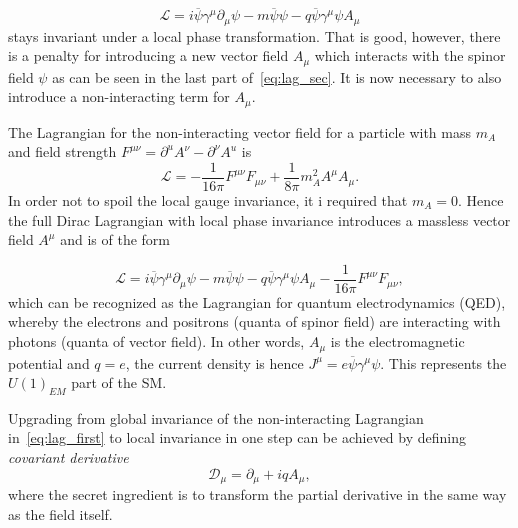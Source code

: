 \begin{equation}
	\mathcal{L} = i\overline{\psi}\gamma^{\mu}\partial_{\mu}\psi - m\overline{\psi}\psi - q\overline{\psi}\gamma^{\mu}\psi A_{\mu}
\label{eq:lag_sec}
\end{equation}
stays invariant under a local phase transformation. That is good, however, there is a penalty for introducing a new vector field $A_{\mu}$ which interacts with the spinor field $\psi$ as can be seen in the last part of~\autoref{eq:lag_sec}. It is now necessary to also introduce a non-interacting term for $A_{\mu}$.

The Lagrangian for the non-interacting vector field for a particle with mass $m_{A}$ and field strength $F^{\mu\nu}=\partial^{u}A^{\nu} - \partial^{\nu}A^{u}$ is
\begin{equation}
\mathcal{L}= -\frac{1}{16\pi} F^{\mu\nu}F_{\mu\nu} + \frac{1}{8\pi}m_{A}^{2}A^{\mu}A_{\mu}.
\end{equation}
In order not to spoil the local gauge invariance, it i required that $m_{A}=0$. Hence the full Dirac Lagrangian with local phase invariance introduces a massless vector field $A^{\mu}$ and is of the form

\begin{equation}
	\mathcal{L} = i\overline{\psi}\gamma^{\mu}\partial_{\mu}\psi - m\overline{\psi}\psi - q\overline{\psi}\gamma^{\mu}\psi A_{\mu} -\frac{1}{16\pi} F^{\mu\nu}F_{\mu\nu},
\label{eq:lag_thir}
\end{equation}
which can be recognized as the Lagrangian for quantum electrodynamics (\gls{QED}), whereby the electrons and positrons (quanta of spinor field) are interacting with photons (quanta of vector field). In other words, $A_{\mu}$ is the electromagnetic potential and $q=e$, the current density is hence $J^{\mu}=e\overline{\psi}\gamma^{\mu}\psi$. This represents the $U(1)_{EM}$ part of the SM.

Upgrading from global invariance of the non-interacting Lagrangian in~\autoref{eq:lag_first} to local invariance in one step can be achieved by defining \textit{covariant derivative}
\begin{equation}
	\mathcal{D}_{\mu} = \partial_{\mu}+ iqA_{\mu},
\end{equation}
where the secret ingredient is to transform the partial derivative in the same way as the field itself.%

